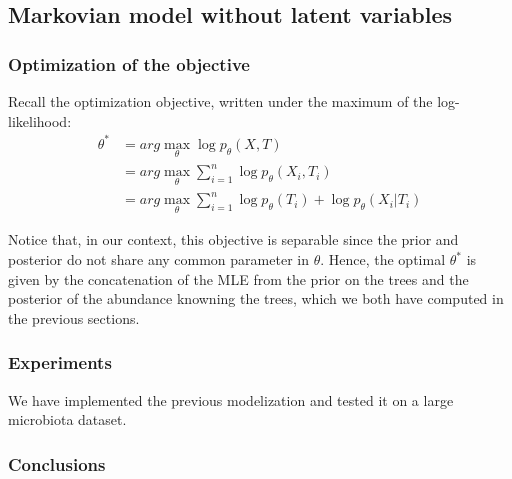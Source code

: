 \subsection{Markovian model without latent variables}





\subsubsection{Optimization of the objective}

Recall the optimization objective, written under the maximum of the log-likelihood:
$$
\begin{align}
    \theta^* &= arg \max_{\theta} \log p_{\theta}(X,T) \\
            &= arg \max_{\theta} \sum_{i=1}^n \log p_{\theta}(X_i, T_i) \\
            &= arg \max_{\theta} \sum_{i=1}^n \log p_{\theta}(T_i) + \log p_{\theta}(X_i | T_i)
\end{align}
$$

Notice that, in our context, this objective is separable since the prior and posterior do not share any common parameter in $\theta$.
Hence, the optimal $\theta^*$ is given by the concatenation of the MLE from the prior on the trees and the posterior of the abundance knowning the trees,
which we both have computed in the previous sections.

\subsubsection{Experiments}

We have implemented the previous modelization and tested it on a large microbiota dataset.

\subsubsection{Conclusions}

